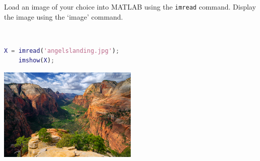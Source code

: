 Load an image of your choice into MATLAB using the \texttt{imread} command. Display the image
using the ‘image’ command.

\begin{solution}\ 
    \begin{lstlisting}[language=Matlab]
    X = imread('angelslanding.jpg');
    imshow(X);
    \end{lstlisting}

    \begin{center}
        \includegraphics[width=0.5\textwidth]{img/e7p1.jpg}
    \end{center}
\end{solution}
